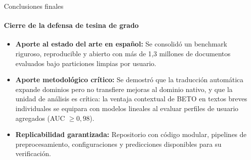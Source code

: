 \begin{frame}{Conclusiones finales}
  \framesubtitle{Cierre de la defensa de tesina de grado}


  \vskip0.1cm
  \begin{itemize}
    \item \textbf{Aporte al estado del arte en español:} Se consolidó un benchmark riguroso, reproducible y abierto con más de 1{,}3 millones de documentos evaluados bajo particiones limpias por usuario.
    \item \textbf{Aporte metodológico crítico:} Se demostró que la traducción automática expande dominios pero no transfiere mejoras al dominio nativo, y que la unidad de análisis es crítica: la ventaja contextual de BETO en textos breves individuales se equipara con modelos lineales al evaluar perfiles de usuario agregados (AUC $\ge 0{,}98$).
    \item \textbf{Replicabilidad garantizada:} Repositorio con código modular, pipelines de preprocesamiento, configuraciones y predicciones disponibles para su verificación.
  \end{itemize}

\end{frame}

